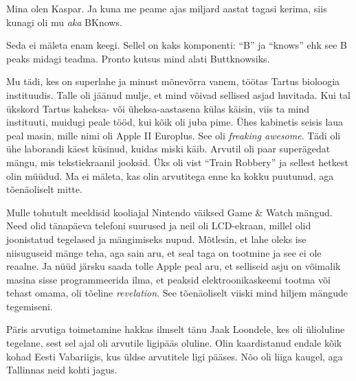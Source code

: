 

Mina olen Kaspar. Ja kuna me peame ajas miljard aastat tagasi kerima, siis 
kunagi oli mu \emph{aka} BKnows. 


Seda ei mäleta enam keegi. Sellel on kaks komponenti: 
\enquote{B} ja \enquote{knows} ehk see B peaks midagi 
teadma. Pronto kutsus mind alati Buttknowsiks.


Mu tädi, kes on superlahe ja minust mõnevõrra vanem, 
töötas Tartus bioloogia instituudis. Talle oli jäänud mulje, et mind võivad 
sellised asjad huvitada. Kui tal ükskord Tartus kaheksa- või üheksa-aastasena
külas käisin, viis ta mind instituuti, muidugi peale tööd, kui kõik oli juba 
pime. 
Ühes kabinetis seisis laua peal masin, mille nimi oli Apple II 
Europlus. See oli \emph{freaking awesome}. 
Tädi oli ühe laborandi käest küsinud, kuidas miski käib. Arvutil oli paar 
superägedat mängu, mis tekstiekraanil jooksid. Üks oli vist \enquote{Train 
Robbery} ja sellest hetkest olin müüdud. Ma ei mäleta, kas 
olin arvutitega enne ka kokku puutunud, aga tõenäoliselt mitte. 

Mulle tohutult meeldisid kooliajal Nintendo väiksed Game \& 
Watch mängud. Need olid tänapäeva 
telefoni suurused ja neil oli LCD-ekraan, millel olid joonistatud 
tegelased ja mängimiseks nupud. Mõtlesin, et 
lahe oleks ise niisuguseid mänge teha, aga sain aru, et seal taga 
on tootmine ja see ei ole reaalne. Ja nüüd järsku saada tolle Apple peal aru, 
et 
selliseid asju on võimalik masina sisse programmeerida ilma, et peaksid 
elektroonikaskeemi tootma või tehast omama, oli tõeline
\emph{revelation}. See tõenäoliselt viiski mind hiljem
mängude tegemiseni. 

Päris arvutiga toimetamine hakkas ilmselt tänu Jaak 
Loondele, kes oli ülioluline tegelane, sest 
sel ajal oli arvutile ligipääs oluline. 
Olin kaardistanud endale kõik kohad Eesti Vabariigis, kus üldse 
arvutitele ligi pääses. Nõo oli liiga kaugel, aga Tallinnas neid kohti jagus. 

